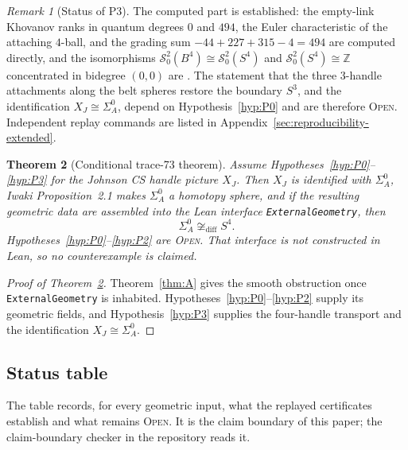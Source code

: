 \documentclass[11pt]{amsart}
\newtheorem{theorem}{Theorem}[section]
\theoremstyle{definition}
\theoremstyle{remark}
\newtheorem{remark}[theorem]{Remark}
\newcommand{\Open}{\textnormal{\textsc{Open}}}
\begin{document}
\begin{remark}[Status of P3]
The computed part is established: the empty-link Khovanov ranks in quantum
degrees $0$ and $494$, the Euler characteristic of the attaching $4$-ball,
and the grading sum $-44+227+315-4=494$ are computed directly, and the
isomorphisms $\mathcal S^2_0(B^4)\cong\mathcal S^2_0(S^4)$ and
$\mathcal S^2_0(S^4)\cong\mathbb Z$ concentrated in bidegree $(0,0)$ are
\cite[Proposition~3.4 and Corollary~3.5]{ManolescuWalkerWedrich2023}.
The statement that the three $3$-handle attachments along the belt spheres
restore the boundary $S^3$, and the identification $X_J\cong\Sigma_A^0$,
depend on Hypothesis~\ref{hyp:P0} and are therefore \Open.  Independent
replay commands are listed in Appendix~\ref{sec:reproducibility-extended}.
\end{remark}

\begin{theorem}[Conditional trace-73 theorem]\label{thm:joined}
Assume Hypotheses~\ref{hyp:P0}--\ref{hyp:P3} for the Johnson CS handle
picture $X_J$.  Then $X_J$ is identified with $\Sigma_A^0$, Iwaki
Proposition~2.1 makes $\Sigma_A^0$ a homotopy sphere, and if the resulting
geometric data are assembled into the Lean interface
\texttt{ExternalGeometry}, then
\[
\Sigma_A^0\not\cong_{\mathrm{diff}}S^4.
\]
Hypotheses~\ref{hyp:P0}--\ref{hyp:P2} are \Open.
That interface is not constructed in Lean, so no counterexample is claimed.
\end{theorem}

\begin{proof}[Proof of Theorem~\ref{thm:joined}]
Theorem~\ref{thm:A} gives the smooth obstruction once
\texttt{ExternalGeometry} is inhabited.  Hypotheses~\ref{hyp:P0}--\ref{hyp:P2}
supply its geometric fields, and Hypothesis~\ref{hyp:P3} supplies the
four-handle transport and the identification $X_J\cong\Sigma_A^0$.
\end{proof}

\subsection{Status table}\label{sec:status-table}

The table records, for every geometric input, what the replayed
certificates establish and what remains \Open.  It is the claim boundary of
this paper; the claim-boundary checker in the repository reads it.
\end{document}
